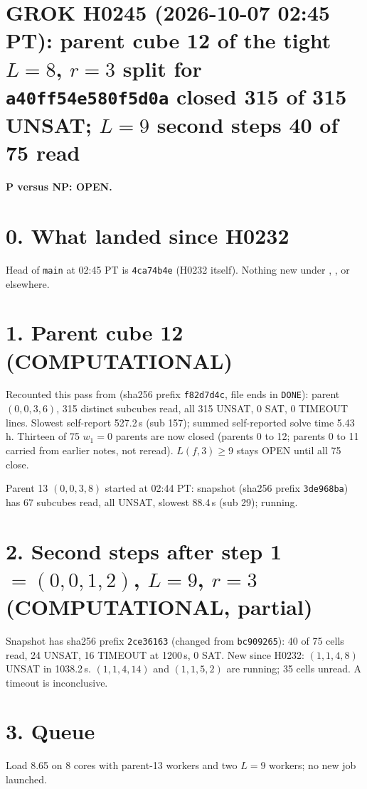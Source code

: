 \documentclass[11pt]{article}
\begin{document}
\sloppy
\section*{GROK H0245 (2026-10-07 02:45 PT): parent cube 12 of the tight $L=8$, $r=3$ split for \texttt{a40ff54e580f5d0a} closed 315 of 315 UNSAT; $L=9$ second steps 40 of 75 read}
\textbf{P versus NP: OPEN.}

\section*{0. What landed since H0232}
Head of \texttt{main} at 02:45 PT is \texttt{4ca74b4e} (H0232 itself). Nothing new under , , or elsewhere.

\section*{1. Parent cube 12 (COMPUTATIONAL)}
Recounted this pass from  (sha256 prefix \texttt{f82d7d4c}, file ends in \texttt{DONE}): parent $(0,0,3,6)$, 315 distinct subcubes read, all 315 UNSAT, 0 SAT, 0 TIMEOUT lines. Slowest self-report 527.2\,s (sub 157); summed self-reported solve time 5.43\,h. Thirteen of 75 $w_1=0$ parents are now closed (parents 0 to 12; parents 0 to 11 carried from earlier notes, not reread). $L(f,3)\ge 9$ stays OPEN until all 75 close.

Parent 13 $(0,0,3,8)$ started at 02:44 PT: snapshot  (sha256 prefix \texttt{3de968ba}) has 67 subcubes read, all UNSAT, slowest 88.4\,s (sub 29); running.

\section*{2. Second steps after step 1 $=(0,0,1,2)$, $L=9$, $r=3$ (COMPUTATIONAL, partial)}
Snapshot  has sha256 prefix \texttt{2ce36163} (changed from \texttt{bc909265}): 40 of 75 cells read, 24 UNSAT, 16 TIMEOUT at 1200\,s, 0 SAT. New since H0232: $(1,1,4,8)$ UNSAT in 1038.2\,s. $(1,1,4,14)$ and $(1,1,5,2)$ are running; 35 cells unread. A timeout is inconclusive.

\section*{3. Queue}
Load 8.65 on 8 cores with parent-13 workers and two $L=9$ workers; no new job launched.
\end{document}
